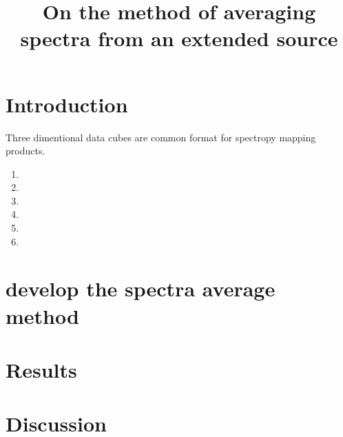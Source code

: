 \documentclass[manuscript]{aastex61}
\begin{document}
\title{On the method of averaging spectra from an extended source }




\begin{abstract}


\end{abstract}

\keywords{}

\section{Introduction} \label{sec:intro}
Three dimentional data cubes are common format for spectropy mapping products.

\begin{enumerate}
\item 
\item 
\item 
\item 
\item 
\item 
\end{enumerate}

\section{develop the spectra average method} \label{sec:method}
\section{Results} \label{sec:result}
\section{Discussion} \label{sec:disc}

\acknowledgments

\appendix


\end{document}
